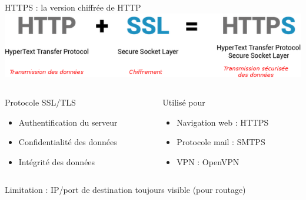 \begin{frame}{HTTPS : la version chiffrée de HTTP}
    \includegraphics[width=\linewidth]{../medias/http-ssl.png}

    \hspace{10cm}

    \begin{columns}
        \begin{column}{0.5\textwidth}
            \begin{exampleblock}{Protocole SSL/TLS}
                \begin{itemize}
                    \item{Authentification du serveur}
                    \item{Confidentialité des données}
                    \item{Intégrité des données}
                \end{itemize}
            \end{exampleblock}
        \end{column}

        \begin{column}{0.5\textwidth}
            \begin{block}{Utilisé pour}
                \begin{itemize}
                    \item{Navigation web : HTTPS}
                    \item{Protocole mail : SMTPS}
                    \item{VPN : OpenVPN}
                \end{itemize}
            \end{block}
        \end{column}
    \end{columns}
    \hspace{20cm}

    {\Large \centerline{\alert{Limitation} : IP/port de destination toujours visible (pour routage)}}
\end{frame}



